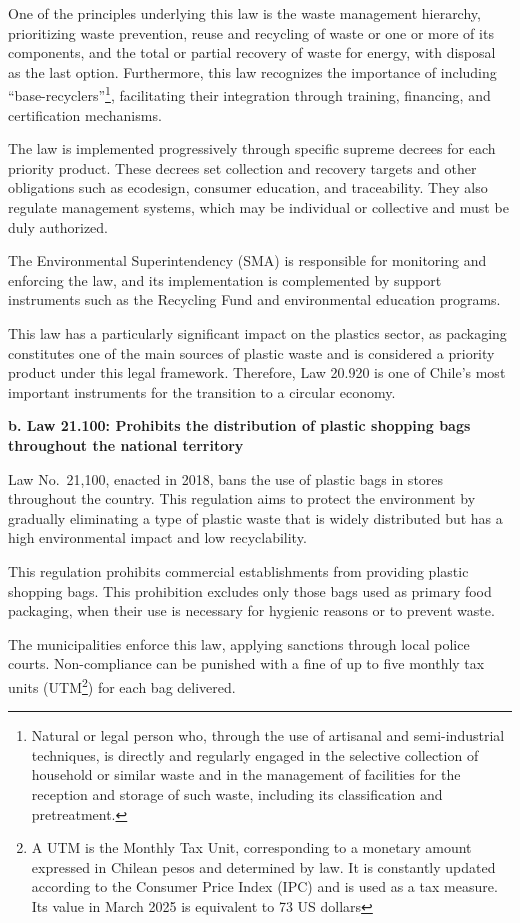 \documentclass[
  12pt,
  oneside]{book}
\begin{document}
One of the principles underlying this law is the waste management
hierarchy, prioritizing waste prevention, reuse and recycling of waste
or one or more of its components, and the total or partial recovery of
waste for energy, with disposal as the last option. Furthermore, this
law recognizes the importance of including
``base-recyclers''\footnote{Natural or legal person who, through the use
  of artisanal and semi-industrial techniques, is directly and regularly
  engaged in the selective collection of household or similar waste and
  in the management of facilities for the reception and storage of such
  waste, including its classification and pretreatment.}, facilitating
their integration through training, financing, and certification
mechanisms.

The law is implemented progressively through specific supreme decrees
for each priority product. These decrees set collection and recovery
targets and other obligations such as ecodesign, consumer education, and
traceability. They also regulate management systems, which may be
individual or collective and must be duly authorized.

The Environmental Superintendency (SMA) is responsible for monitoring
and enforcing the law, and its implementation is complemented by support
instruments such as the Recycling Fund and environmental education
programs.

This law has a particularly significant impact on the plastics sector,
as packaging constitutes one of the main sources of plastic waste and is
considered a priority product under this legal framework. Therefore, Law
20.920 is one of Chile's most important instruments for the transition
to a circular economy.

\textbf{b. Law 21.100: Prohibits the distribution of plastic shopping
bags throughout the national territory}

Law No.~21,100, enacted in 2018, bans the use of plastic bags in stores
throughout the country. This regulation aims to protect the environment
by gradually eliminating a type of plastic waste that is widely
distributed but has a high environmental impact and low recyclability.

This regulation prohibits commercial establishments from providing
plastic shopping bags. This prohibition excludes only those bags used as
primary food packaging, when their use is necessary for hygienic reasons
or to prevent waste.

The municipalities enforce this law, applying sanctions through local
police courts. Non-compliance can be punished with a fine of up to five
monthly tax units (UTM\footnote{A UTM is the Monthly Tax Unit,
  corresponding to a monetary amount expressed in Chilean pesos and
  determined by law. It is constantly updated according to the Consumer
  Price Index (IPC) and is used as a tax measure. Its value in March
  2025 is equivalent to 73 US dollars}) for each bag delivered.
\end{document}

